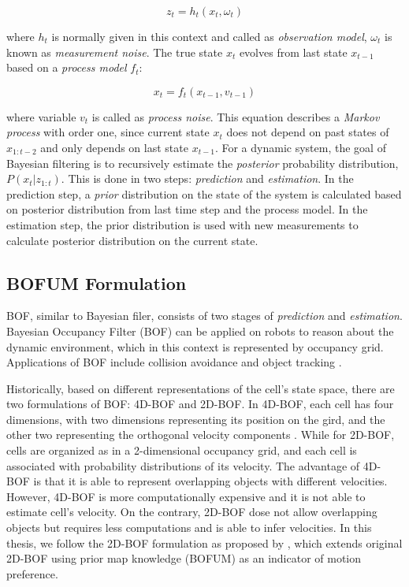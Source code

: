 \begin{equation}
z_t = h_t(x_t, \omega_t)
\end{equation}

where $h_t$ is normally given in this context and called as \textit{observation model}, $\omega_t$ is known as \textit{measurement noise}. The true state $x_t$ evolves from last state $x_{t-1}$ based on a \textit{process model} $f_t$:

\begin{equation}
x_t = f_t(x_{t-1}, v_{t-1})
\end{equation}

where variable $v_{t}$ is called as \textit{process noise}. This equation describes a \textit{Markov process} with order one, since current state $x_t$ does not depend on past states of $x_{1:t-2}$ and only depends on last state $x_{t-1}$. For a dynamic system, the goal of Bayesian filtering is to recursively estimate the \textit{posterior} probability distribution, $P(x_t|z_{1:t})$. This is done in two steps: \textit{prediction} and \textit{estimation}. In the prediction step, a \textit{prior} distribution on the state of the system is calculated based on posterior distribution from last time step and the process model. In the estimation step, the prior distribution is used with new measurements to calculate  posterior distribution on the current state.

\subsection{BOFUM Formulation} \label{sec:bof}

BOF, similar to Bayesian filer, consists of two stages of \textit{prediction} and \textit{estimation}. Bayesian Occupancy Filter (BOF) can be applied on robots to reason about the dynamic environment, which in this context is represented by occupancy grid. Applications of BOF include collision avoidance \citep{coue2006bayesian} and object tracking \citep{chen2006dynamic}.

Historically, based on different representations of the cell's state space, there are two formulations of BOF: 4D-BOF and 2D-BOF. In 4D-BOF, each cell has four dimensions, with two dimensions representing its position on the gird, and the other two representing the orthogonal velocity components \citep{coue2006bayesian}. While for 2D-BOF, cells are organized as in a 2-dimensional occupancy grid, and each cell is associated with probability distributions of its velocity. The advantage of 4D-BOF is that it is able to represent overlapping objects with different velocities. However, 4D-BOF is more computationally expensive and it is not able to estimate cell's velocity. On the contrary, 2D-BOF dose not allow overlapping objects but requires less computations and is able to infer velocities. In this thesis, we follow the 2D-BOF formulation as proposed by \citet{gindele2009bayesian}, which extends original 2D-BOF using prior map knowledge (BOFUM) as an indicator of motion preference. 			

